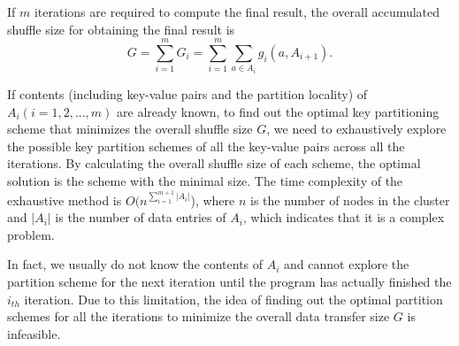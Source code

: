 \documentclass[10pt,journal,compsoc]{IEEEtran}
\newcommand{\red}[1]{\textcolor{red}{#1}}
\begin{document}

If $m$ iterations are required to compute the final result, 
the overall accumulated shuffle size for obtaining the final result is
\begin{equation}\label{eq:g}
G=\sum_{i=1}^{m} G_i=\sum_{i=1}^{m} \sum_{a \in A_i} g_i(a,A_{i+1}).
\end{equation}



If contents (including key-value pairs and the partition locality) of $A_i (i=1,2,...,m)$ are already known, to find out the optimal key partitioning scheme that minimizes 
the overall shuffle size $G$,  %
we need to exhaustively explore the possible key partition schemes of all the key-value pairs across all the iterations. 
By calculating the overall shuffle size of each scheme, the optimal solution is the scheme with the minimal size. 
The time complexity of the exhaustive method is $O(n^{\sum_{i=1}^{m+1} |A_i|}$), 
where $n$ is the number of nodes in the cluster and $|A_i|$ is the number of data entries of $A_i$, 
which indicates that it is a complex problem. 

In fact, we usually do not know the contents of $A_i$ and cannot explore the partition scheme 
for the next iteration until the program has actually finished the $i_{th}$ iteration. 
Due to this limitation, the idea of finding out the optimal partition schemes for all the iterations to minimize the overall data transfer size $G$ is infeasible. 
\end{document}

